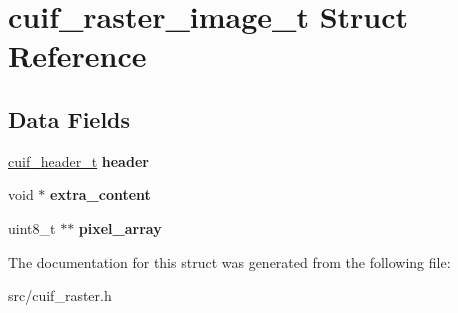 \hypertarget{structcuif__raster__image__t}{\section{cuif\+\_\+raster\+\_\+image\+\_\+t Struct Reference}
\label{structcuif__raster__image__t}
}
\subsection*{Data Fields}
\begin{DoxyCompactItemize}
\item 
\hypertarget{structcuif__raster__image__t_a4039f32dcf35ad7db3f508a5f09f687d}{\hyperlink{structcuif__header__t}{cuif\+\_\+header\+\_\+t} {\bfseries header}}\label{structcuif__raster__image__t_a4039f32dcf35ad7db3f508a5f09f687d}

\item 
\hypertarget{structcuif__raster__image__t_a89743696e792b017f573d17598b99c23}{void $\ast$ {\bfseries extra\+\_\+content}}\label{structcuif__raster__image__t_a89743696e792b017f573d17598b99c23}

\item 
\hypertarget{structcuif__raster__image__t_a3c04342800020cf8158b35fd2e71dcf9}{uint8\+\_\+t $\ast$$\ast$ {\bfseries pixel\+\_\+array}}\label{structcuif__raster__image__t_a3c04342800020cf8158b35fd2e71dcf9}

\end{DoxyCompactItemize}


The documentation for this struct was generated from the following file\+:\begin{DoxyCompactItemize}
\item 
src/cuif\+\_\+raster.\+h\end{DoxyCompactItemize}
